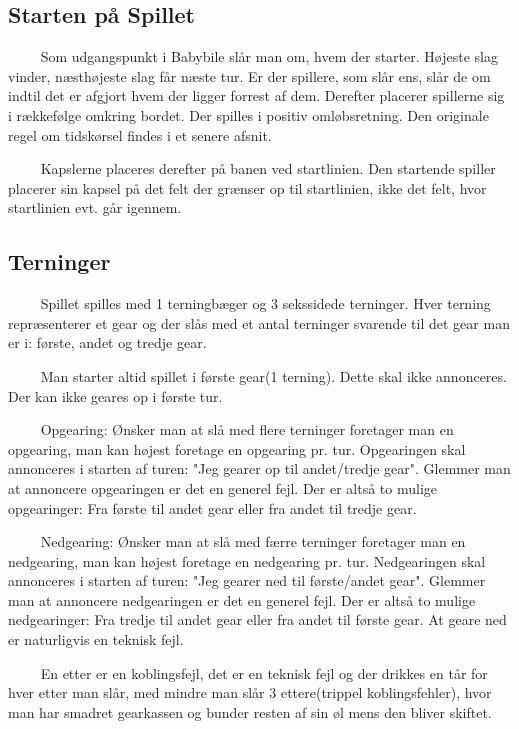 \documentclass[12pt]{article}
\begin{document}
\subsection*{Starten på Spillet}

$\qquad$ Som udgangspunkt i Babybile slår man om, hvem der starter. Højeste slag vinder, næsthøjeste slag får næste tur. Er der spillere, som slår ens, slår de om indtil det er afgjort hvem der ligger forrest af dem. Derefter placerer spillerne sig i rækkefølge omkring bordet. Der spilles i positiv omløbsretning. Den originale regel om tidskørsel findes i et senere afsnit.

$\qquad$ Kapslerne placeres derefter på banen ved startlinien. Den startende spiller placerer sin kapsel på det felt der grænser op til startlinien, ikke det felt, hvor startlinien evt. går igennem.


\subsection*{Terninger}

$\qquad$ Spillet spilles med 1 terningbæger og 3 sekssidede terninger. Hver terning repræsenterer et gear og der slås med et antal terninger svarende til det gear man er i: første, andet og tredje gear.

$\qquad$ Man starter altid spillet i første gear(1 terning). Dette skal ikke annonceres. Der kan ikke geares op i første tur.

$\qquad$ Opgearing: Ønsker man at slå med flere terninger foretager man en opgearing, man kan højest foretage en opgearing pr. tur. Opgearingen skal annonceres i starten af turen: "Jeg gearer op til andet/tredje gear". Glemmer man at annoncere opgearingen er det en generel fejl. Der er altså to mulige opgearinger: Fra første til andet gear eller fra andet til tredje gear.

$\qquad$ Nedgearing: Ønsker man at slå med færre terninger foretager man en nedgearing, man kan højest foretage en nedgearing pr. tur. Nedgearingen skal annonceres i starten af turen: "Jeg gearer ned til første/andet gear". Glemmer man at annoncere nedgearingen er det en generel fejl. Der er altså to mulige nedgearinger: Fra tredje til andet gear eller fra andet til første gear. At geare ned er naturligvis en teknisk fejl.

$\qquad$ En etter er en koblingsfejl, det er en teknisk fejl og der drikkes en tår for hver etter man slår, med mindre man slår 3 ettere(trippel koblingsfehler), hvor man har smadret gearkassen og bunder resten af sin øl mens den bliver skiftet.
\end{document}
